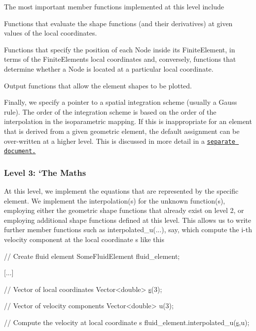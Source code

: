 The most important member functions implemented at this level include
\begin{DoxyItemize}
\item Functions that evaluate the shape functions (and their derivatives) at given values of the local coordinates.
\item Functions that specify the position of each {\ttfamily Node} inside its {\ttfamily Finite\+Element}, in terms of the {\ttfamily Finite\+Element\textquotesingle{}s} local coordinates and, conversely, functions that determine whether a {\ttfamily Node} is located at a particular local coordinate.
\item Output functions that allow the element shapes to be plotted.
\end{DoxyItemize}Finally, we specify a pointer to a spatial integration scheme (usually a Gauss rule). The order of the integration scheme is based on the order of the interpolation in the isoparametric mapping. If this is inappropriate for an element that is derived from a given geometric element, the default assignment can be over-\/written at a higher level. This is discussed in more detail in a \href{../../optimisation/html/index.html}{\tt separate document.}\hypertarget{index_Maths_Element}{}\subsubsection{Level 3\+: `\+The Maths\textquotesingle{}}\label{index_Maths_Element}
At this level, we implement the equations that are represented by the specific element. We implement the interpolation(s) for the unknown function(s), employing either the geometric shape functions that already exist on level 2, or employing additional shape functions defined at this level. This allows us to write further member functions such as {\ttfamily interpolated\+\_\+u}(...), say, which compute the i-\/th velocity component at the local coordinate {\ttfamily s} like this 
\begin{DoxyCode}
\textcolor{comment}{// Create fluid element}
SomeFluidElement fluid\_element;

[...]

\textcolor{comment}{// Vector of local coordinates}
Vector<double> \hyperlink{cfortran_8h_ab7123126e4885ef647dd9c6e3807a21c}{s}(3);

\textcolor{comment}{// Vector of velocity components}
Vector<double> u(3);

\textcolor{comment}{// Compute the velocity at local coordinate s}
fluid\_element.interpolated\_u(\hyperlink{cfortran_8h_ab7123126e4885ef647dd9c6e3807a21c}{s},u);
\end{DoxyCode}
